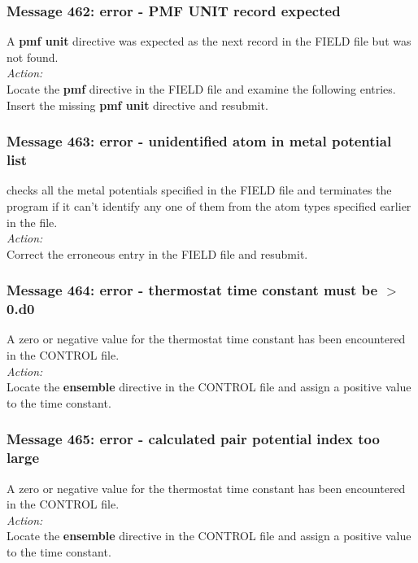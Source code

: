 \subsubsection*{Message 462: error - PMF UNIT  record expected}

A {\bf pmf unit} directive was expected as the next record in the FIELD file but was not
found.\\

\noindent
{\em Action:} \\
Locate the {\bf pmf} directive in the FIELD file and examine the
following entries. Insert the missing {\bf pmf unit} directive and
resubmit.

\subsubsection*{Message 463: error - unidentified atom in metal potential list}

\D{} checks all the metal potentials specified in the FIELD file
and terminates the program if it can't identify any one of them from
the atom types specified earlier in the file. \\ 

\noindent
{\em Action:} \\ 
Correct the erroneous entry in the FIELD file and resubmit.

\subsubsection*{Message 464: error - thermostat time constant must be $>$
0.d0}

A zero or negative value for the thermostat  time constant has been encountered
in the CONTROL file.\\

\noindent
{\em Action:} \\
Locate the {\bf ensemble} directive in the CONTROL file and assign a
positive value to the time constant. 

\subsubsection*{Message 465: error - calculated pair potential index too large}

A zero or negative value for the thermostat  time constant has been encountered
in the CONTROL file.\\

\noindent
{\em Action:} \\
Locate the {\bf ensemble} directive in the CONTROL file and assign a
positive value to the time constant. 

